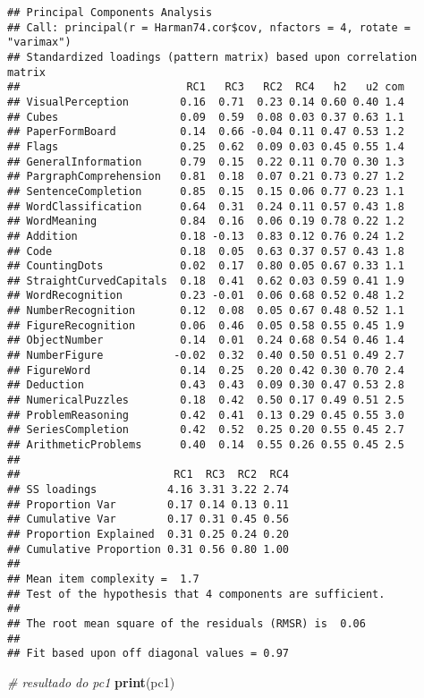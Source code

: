 \documentclass[]{book}
\newenvironment{Shaded}{\begin{snugshade}}{\end{snugshade}}
\newcommand{\KeywordTok}[1]{\textcolor[rgb]{0.13,0.29,0.53}{\textbf{{#1}}}}
\newcommand{\CommentTok}[1]{\textcolor[rgb]{0.56,0.35,0.01}{\textit{{#1}}}}
\newcommand{\NormalTok}[1]{{#1}}
\begin{document}
\begin{verbatim}
## Principal Components Analysis
## Call: principal(r = Harman74.cor$cov, nfactors = 4, rotate = "varimax")
## Standardized loadings (pattern matrix) based upon correlation matrix
##                          RC1   RC3   RC2  RC4   h2   u2 com
## VisualPerception        0.16  0.71  0.23 0.14 0.60 0.40 1.4
## Cubes                   0.09  0.59  0.08 0.03 0.37 0.63 1.1
## PaperFormBoard          0.14  0.66 -0.04 0.11 0.47 0.53 1.2
## Flags                   0.25  0.62  0.09 0.03 0.45 0.55 1.4
## GeneralInformation      0.79  0.15  0.22 0.11 0.70 0.30 1.3
## PargraphComprehension   0.81  0.18  0.07 0.21 0.73 0.27 1.2
## SentenceCompletion      0.85  0.15  0.15 0.06 0.77 0.23 1.1
## WordClassification      0.64  0.31  0.24 0.11 0.57 0.43 1.8
## WordMeaning             0.84  0.16  0.06 0.19 0.78 0.22 1.2
## Addition                0.18 -0.13  0.83 0.12 0.76 0.24 1.2
## Code                    0.18  0.05  0.63 0.37 0.57 0.43 1.8
## CountingDots            0.02  0.17  0.80 0.05 0.67 0.33 1.1
## StraightCurvedCapitals  0.18  0.41  0.62 0.03 0.59 0.41 1.9
## WordRecognition         0.23 -0.01  0.06 0.68 0.52 0.48 1.2
## NumberRecognition       0.12  0.08  0.05 0.67 0.48 0.52 1.1
## FigureRecognition       0.06  0.46  0.05 0.58 0.55 0.45 1.9
## ObjectNumber            0.14  0.01  0.24 0.68 0.54 0.46 1.4
## NumberFigure           -0.02  0.32  0.40 0.50 0.51 0.49 2.7
## FigureWord              0.14  0.25  0.20 0.42 0.30 0.70 2.4
## Deduction               0.43  0.43  0.09 0.30 0.47 0.53 2.8
## NumericalPuzzles        0.18  0.42  0.50 0.17 0.49 0.51 2.5
## ProblemReasoning        0.42  0.41  0.13 0.29 0.45 0.55 3.0
## SeriesCompletion        0.42  0.52  0.25 0.20 0.55 0.45 2.7
## ArithmeticProblems      0.40  0.14  0.55 0.26 0.55 0.45 2.5
## 
##                        RC1  RC3  RC2  RC4
## SS loadings           4.16 3.31 3.22 2.74
## Proportion Var        0.17 0.14 0.13 0.11
## Cumulative Var        0.17 0.31 0.45 0.56
## Proportion Explained  0.31 0.25 0.24 0.20
## Cumulative Proportion 0.31 0.56 0.80 1.00
## 
## Mean item complexity =  1.7
## Test of the hypothesis that 4 components are sufficient.
## 
## The root mean square of the residuals (RMSR) is  0.06 
## 
## Fit based upon off diagonal values = 0.97
\end{verbatim}

\begin{Shaded}
\begin{Highlighting}[]
\CommentTok{# resultado do pc1}
\KeywordTok{print}\NormalTok{(pc1)}
\end{Highlighting}
\end{Shaded}
\end{document}
